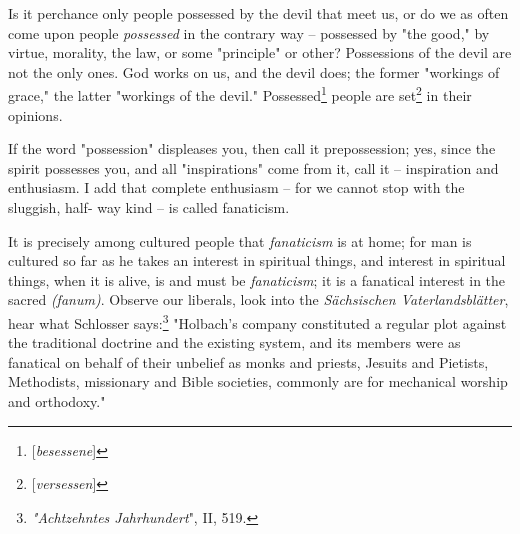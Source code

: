 Is it perchance only people possessed by the devil that meet us, or do we as 
often come upon people \textit{possessed} in the contrary way -- possessed by 
"{}the good,"{} by virtue, morality, the law, or some "{}principle"{} or 
other? Possessions of the devil are not the only ones. God works on us, and 
the devil does; the former "{}workings of grace,"{} the latter "{}workings of 
the devil."{} Possessed\footnote{[\textit{besessene}]} people are 
set\footnote{[\textit{versessen}]} in their opinions.

If the word "{}possession"{} displeases you, then call it prepossession; yes, 
since the spirit possesses you, and all "{}inspirations"{} come from it, call 
it -- inspiration and enthusiasm. I add that complete enthusiasm -- for we 
cannot stop with the sluggish, half- way kind -- is called fanaticism.

It is precisely among cultured people that \textit{fanaticism} is at home; for 
man is cultured so far as he takes an interest in spiritual things, and 
interest in spiritual things, when it is alive, is and must be 
\textit{fanaticism}; it is a fanatical interest in the sacred 
\textit{(fanum)}. Observe our liberals, look into the \textit{S\"achsischen 
Vaterlandsbl\"atter}, hear what Schlosser 
says:\footnote{\textit{"{}Achtzehntes Jahrhundert}"{}, II, 519.} "{}Holbach's 
company constituted a regular plot against the traditional doctrine and the 
existing system, and its members were as fanatical on behalf of their unbelief 
as monks and priests, Jesuits and Pietists, Methodists, missionary and Bible 
societies, commonly are for mechanical worship and orthodoxy."{}

